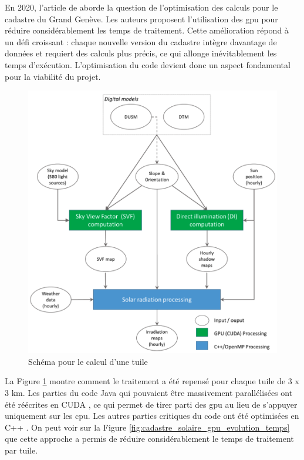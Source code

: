 \par{En 2020, l'article \cite{stendardo_gpu-enabled_2020} de \citeauthor{stendardo_gpu-enabled_2020} aborde la question de l'optimisation des calculs pour le cadastre du Grand Genève. Les auteurs proposent l'utilisation des \acrshort{gpu} pour réduire considérablement les temps de traitement. Cette amélioration répond à un défi croissant : chaque nouvelle version du cadastre intègre davantage de données et requiert des calculs plus précis, ce qui allonge inévitablement les temps d'exécution. L'optimisation du code devient donc un aspect fondamental pour la viabilité du projet.}
\begin{figure}[H]
    \centering
    \includegraphics[width=1\linewidth]{02-main//figures/ch2/cadastre_solaire_gpu.png}
    \caption{Schéma pour le calcul d'une tuile \cite{stendardo_gpu-enabled_2020}}
    \label{fig:cadastre_solaire_gpu}
\end{figure}
\par{La Figure \ref{fig:cadastre_solaire_gpu} montre comment le traitement a été repensé pour chaque tuile de 3 x 3 km. Les parties du code Java qui pouvaient être massivement parallélisées ont été réécrites en CUDA \cite{nvidia_cuda_nodate}, ce qui permet de tirer parti des \acrshort{gpu} au lieu de s'appuyer uniquement sur les \acrshort{cpu}. Les autres parties critiques du code ont été optimisées en C++ \cite{noauthor_c_2025}. On peut voir sur la Figure \ref{fig:cadastre_solaire_gpu_evolution_temps} que cette approche a permis de réduire considérablement le temps de traitement par tuile.}

